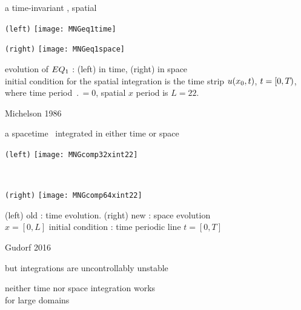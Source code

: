 \begin{frame}{a time-invariant \eqv, spatial \po}
\begin{center}
  \begin{minipage}[height=.45\textheight]{.45\textwidth}
    \centering \small{\texttt{(left)}}
    \texttt{[image: MNGeq1time]}
  \end{minipage}
  \begin{minipage}[height=.45\textheight]{.45\textwidth}
    \centering \small{\texttt{(right)}}
    \texttt{[image: MNGeq1space]}
  \end{minipage}
\end{center}
  evolution of $EQ_{1}$ : (left) in time, (right) in space
   \\
   initial condition for the spatial integration is the time strip
   $u(x_0,t)$, $t = [0,{T_{}})$, where time period
   $\period{} =0$, spatial $x$ period is $L=22$.

\vfill\hfill        Michelson 1986
\end{frame}

\begin{frame}{a spacetime \twot\ integrated in either time or space}
\begin{center}
  \begin{minipage}[height=.40\textheight]{.35\textwidth}
    \centering \small{\texttt{(left)}}
    \texttt{[image: MNGcomp32xint22]}
  \end{minipage}
~~~~~~~~~
  \begin{minipage}[height=.40\textheight]{.35\textwidth}
    \centering \small{\texttt{(right)}}
    \texttt{[image: MNGcomp64xint22]}
  \end{minipage}
\end{center}
    (left) old : time evolution. (right) new : space evolution
    \\
    $x=[0,L]$ %
       initial condition : time periodic line $t = [0,T]$

\vfill\hfill        Gudorf 2016
\end{frame}

\begin{frame}{but integrations are uncontrollably unstable}

\begin{center}
{\huge neither} time {\huge nor} space integration {\huge works} \\
for large domains
\end{center}

\vfill
\color{red}{rethink the calculation}
\end{frame}

